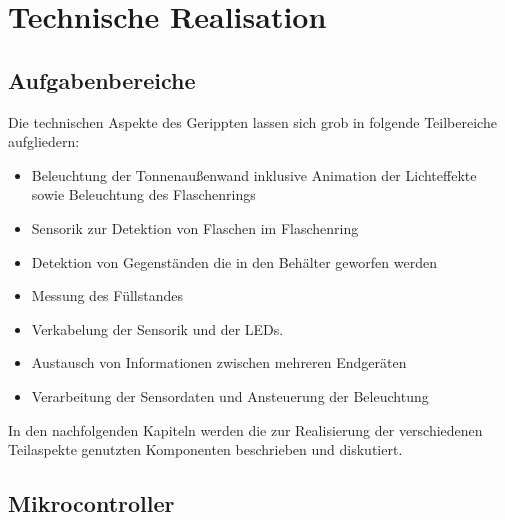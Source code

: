 \chapter{Technische Realisation}

\section{Aufgabenbereiche}

    Die technischen Aspekte des Gerippten lassen sich grob in folgende Teilbereiche aufgliedern:

    \begin{itemize}
        \item Beleuchtung der Tonnenaußenwand inklusive Animation der Lichteffekte sowie Beleuchtung des Flaschenrings
        \item Sensorik zur Detektion von Flaschen im Flaschenring
        \item Detektion von Gegenständen die in den Behälter geworfen werden
        \item Messung des Füllstandes
        \item Verkabelung der Sensorik und der LEDs.
        \item Austausch von Informationen zwischen mehreren Endgeräten
        \item Verarbeitung der Sensordaten und Ansteuerung der Beleuchtung
    \end{itemize}

    In den nachfolgenden Kapiteln werden die zur Realisierung der verschiedenen Teilaspekte genutzten Komponenten beschrieben und diskutiert.


\section{Mikrocontroller}

